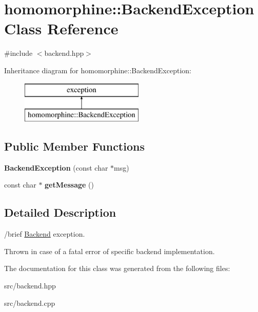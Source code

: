 \hypertarget{classhomomorphine_1_1_backend_exception}{}\section{homomorphine\+:\+:Backend\+Exception Class Reference}
\label{classhomomorphine_1_1_backend_exception}


{\ttfamily \#include $<$backend.\+hpp$>$}

Inheritance diagram for homomorphine\+:\+:Backend\+Exception\+:\begin{figure}[H]
\begin{center}
\leavevmode
\includegraphics[height=2.000000cm]{classhomomorphine_1_1_backend_exception}
\end{center}
\end{figure}
\subsection*{Public Member Functions}
\begin{DoxyCompactItemize}
\item 
\mbox{\label{classhomomorphine_1_1_backend_exception_add89cd603a906324b3d9f899c71bab50}} 
{\bfseries Backend\+Exception} (const char $\ast$msg)
\item 
\mbox{\label{classhomomorphine_1_1_backend_exception_a5b6595c44ccf8e2196c7989f695d71a4}} 
const char $\ast$ {\bfseries get\+Message} ()
\end{DoxyCompactItemize}


\subsection{Detailed Description}
/brief \hyperlink{classhomomorphine_1_1_backend}{Backend} exception.

Thrown in case of a fatal error of specific backend implementation. 

The documentation for this class was generated from the following files\+:\begin{DoxyCompactItemize}
\item 
src/backend.\+hpp\item 
src/backend.\+cpp\end{DoxyCompactItemize}
